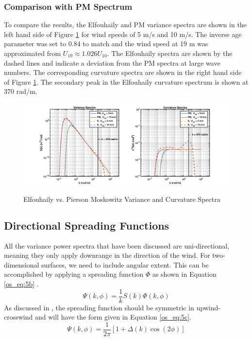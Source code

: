 \subsubsection{Comparison with PM Spectrum}
To compare the results, the Elfouhaily and PM variance spectra are shown in the left hand side of Figure \ref{os_fig:2} for wind speeds of 5 m/s and 10 m/s. The inverse age parameter was set to 0.84 to match and the wind speed at 19 m was approximated from $U_{19} \approx 1.026 U_{10}$. The Elfouhaily spectra are shown by the dashed lines and indicate a deviation from the PM spectra at large wave numbers. The corresponding curvature spectra are shown in the right hand side of Figure \ref{os_fig:2}. The secondary peak in the Elfouhaily curvature spectrum is shown at 370 rad/m.
\begin{figure}[H]
  \begin{center}
\includegraphics[width=6in]{../media/Ocean_Surface/elf_vs_PM_variance_curvature_spectrum.png}
  \end{center}
  \renewcommand{\baselinestretch}{1} \small\normalsize
  \begin{quote}
    \caption[Elfouhaily vs. Pierson Moskowitz Variance and Curvature Spectra]{Elfouhaily vs. Pierson Moskowitz Variance and Curvature Spectra\label{os_fig:2}}
  \end{quote}
\end{figure}
\renewcommand{\baselinestretch}{2} \small\normalsize

\subsection{Directional Spreading Functions}
All the variance power spectra that have been discussed are uni-directional, meaning they only apply downrange in the direction of the wind. For two-dimensional surfaces, we need to include angular extent. This can be accomplished by applying a spreading function $\Phi$ as shown in Equation \ref{os_eq:5b} \cite{elfouhaily}.
\begin{equation}
\label{os_eq:5b}
\Psi(k,\phi) = \frac{1}{k}S(k)\Phi(k,\phi)
\end{equation}
\renewcommand{\baselinestretch}{2} \small\normalsize
As discussed in \cite{elfouhaily}, the spreading function should be symmetric in upwind-crosswind and will have the form given in Equation \ref{os_eq:5c}.
\begin{equation}
\label{os_eq:5c}
\Psi(k,\phi) = \frac{1}{2\pi}\left[1 + \Delta(k)\cos(2\phi) \right]
\end{equation}
\renewcommand{\baselinestretch}{2} \small\normalsize

